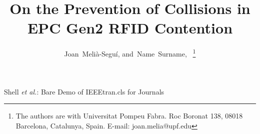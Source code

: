 \documentclass[journal]{IEEEtran}
\begin{document}
%
\title{On the Prevention of Collisions in EPC Gen2 RFID Contention}
%
%
%


\author{Joan~Meli\`{a}-Segu\'{i}, %
        and~Name~Surname,~%
\thanks{The authors are with Universitat Pompeu Fabra.
Roc Boronat 138, 08018 Barcelona, Catalunya, Spain.
E-mail: joan.melia@upf.edu
}
}

%
%



%
{Shell \MakeLowercase{\textit{et al.}}: Bare Demo of IEEEtran.cls for Journals}
%
\end{document}
